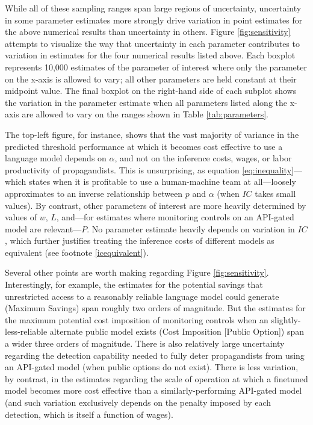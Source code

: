 \documentclass{article}
\begin{document}
While all of these sampling ranges span large regions of uncertainty, uncertainty in some parameter estimates more strongly drive variation in point estimates for the above numerical results than uncertainty in others. Figure \ref{fig:sensitivity} attempts to visualize the way that uncertainty in each parameter contributes to variation in estimates for the four numerical results listed above. Each boxplot represents 10,000 estimates of the parameter of interest where only the parameter on the x-axis is allowed to vary; all other parameters are held constant at their midpoint value. The final boxplot on the right-hand side of each subplot shows the variation in the parameter estimate when all parameters listed along the x-axis are allowed to vary on the ranges shown in Table \ref{tab:parameters}.  

The top-left figure, for instance, shows that the vast majority of variance in the predicted threshold performance at which it becomes cost effective to use a language model depends on $\alpha$, and not on the inference costs, wages, or labor productivity of propagandists. This is unsurprising, as equation \ref{eq:inequality}—which states when it is profitable to use a human-machine team at all—loosely approximates to an inverse relationship between $p$ and $\alpha$ (when $IC$ takes small values). By contrast, other parameters of interest are more heavily determined by values of $w$, $L$, and—for estimates where monitoring controls on an API-gated model are relevant—$P$. No parameter estimate heavily depends on variation in $IC$, which further justifies treating the inference costs of different models as equivalent (see footnote \ref{icequivalent}).

Several other points are worth making regarding Figure \ref{fig:sensitivity}. Interestingly, for example, the estimates for the potential savings that unrestricted access to a reasonably reliable language model could generate (Maximum Savings) span roughly two orders of magnitude. But the estimates for the maximum potential cost imposition of monitoring controls when an slightly-less-reliable alternate public model exists (Cost Imposition [Public Option]) span a wider three orders of magnitude. There is also relatively large uncertainty regarding the detection capability needed to fully deter propagandists from using an API-gated model (when public options do not exist). There is less variation, by contrast, in the estimates regarding the scale of operation at which a finetuned model becomes more cost effective than a similarly-performing API-gated model (and such variation exclusively depends on the penalty imposed by each detection, which is itself a function of wages).
\end{document}

